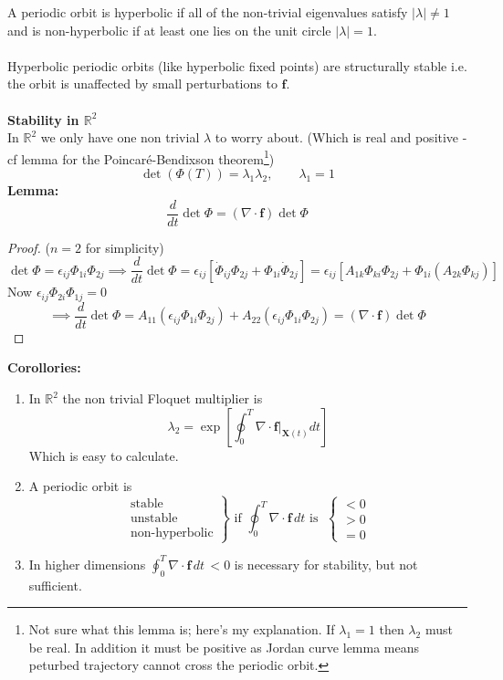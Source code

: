 \documentclass{article}
\newcommand{\lemma}{\textbf{Lemma:}}                        %
\newcommand{\rtwo}{\mathbb{R}^2}                            %
\begin{document}
A periodic orbit is hyperbolic if all of the non-trivial eigenvalues
satisfy $|\lambda|\neq 1$ and is non-hyperbolic if at least one lies on
the unit circle $|\lambda|=1$.
\\
\\
Hyperbolic periodic orbits (like hyperbolic fixed points) are structurally
stable i.e. the orbit is unaffected by small perturbations to $\bm{f}$.
\\
\\
\textbf{Stability in $\mathbb{R}^2$}
\\
In $\mathbb{R}^2$ we only have one non trivial $\lambda$ to worry about.
(Which is real and positive -cf lemma for the Poincar\'e-Bendixson
theorem\footnote{ Not sure what this lemma is; here's my explanation.
If $\lambda_1=1$ then $\lambda_2$ must be real. In addition it must be
positive as Jordan curve lemma means peturbed trajectory cannot cross
the periodic orbit.})
\[ \det(\Phi(T)) = \lambda_1 \lambda_2, \qquad \lambda_1=1\]
\lemma\ 
\[ \frac{d}{dt} \det \Phi = (\nabla \cdot \bm{f}) \det \Phi \]
\begin{proof} ($n=2$ for simplicity)
\[ \det \Phi = \epsilon_{ij} \Phi_{1i}\Phi_{2j} \implies \frac{d}{dt} \det \Phi
= \epsilon_{ij}[ \dot{\Phi}_{ij}\Phi_{2j} + \Phi_{1i} \dot{\Phi}_{2j}] = \epsilon_{ij}
[A_{1k} \Phi_{ki} \Phi_{2j} + \Phi_{1i}(A_{2k} \Phi_{kj})] \]
Now $\epsilon_{ij}\Phi_{2i}\Phi_{1j} = 0$
\[ \implies \frac{d}{dt} \det \Phi = A_{11}(\epsilon_{ij} \Phi_{1i}\Phi_{2j}) +
A_{22}(\epsilon_{ij} \Phi_{1i} \Phi_{2j}) = (\nabla \cdot \bm{f}) \det \Phi \]
\end{proof}
\noindent \textbf{Corollories:}
%
\begin{enumerate}[1.]
\item In $\rtwo$ the non trivial Floquet multiplier is
\[ \lambda_2 = \exp\left[ \oint_0^T \left. \nabla \cdot \bm{f} \right|_{\bm{X}(t)} dt \right] \]
Which is easy to calculate.
%
%
\item A periodic orbit is 
\[ \left. \begin{array}{l} \mbox{stable} \\ \mbox{unstable} \\ 
\mbox{non-hyperbolic} \end{array} \right\} \mbox{ if }
\oint_0^T \nabla \cdot \bm{f} \, dt \mbox{ is } \; \left\{ \begin{array}{l} <0 \\
  >0 \\  =0 \end{array} \right. \]
%
%
\item In higher dimensions $\oint_0^T \nabla \cdot \bm{f} \, dt \, <0$ is 
necessary for stability, but not sufficient.
\end{enumerate}
\end{document}
